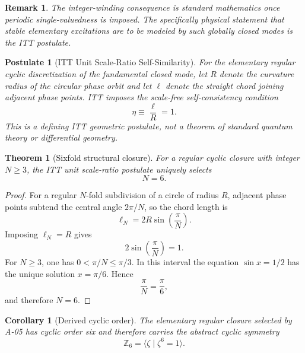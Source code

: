 \documentclass[11pt,a4paper]{article}
\newtheorem{theorem}[definition]{Theorem}
\newtheorem{corollary}[definition]{Corollary}
\newtheorem{postulate}[definition]{Postulate}
\newtheorem{remark}[definition]{Remark}
\begin{document}
\begin{remark}
The integer-winding consequence is standard mathematics once periodic single-valuedness is imposed. The specifically physical statement that stable elementary excitations are to be modeled by such globally closed modes is the ITT postulate.
\end{remark}

\begin{postulate}[ITT Unit Scale-Ratio Self-Similarity]
For the elementary regular cyclic discretization of the fundamental closed mode, let $R$ denote the curvature radius of the circular phase orbit and let $\ell$ denote the straight chord joining adjacent phase points. ITT imposes the scale-free self-consistency condition
\begin{equation}
\boxed{
\eta\equiv\frac{\ell}{R}=1.
}
\end{equation}
This is a defining ITT geometric postulate, not a theorem of standard quantum theory or differential geometry.
\end{postulate}

\begin{theorem}[Sixfold structural closure]
For a regular cyclic closure with integer $N\ge3$, the ITT unit scale-ratio postulate uniquely selects
\begin{equation}
\boxed{N=6.}
\end{equation}
\end{theorem}

\begin{proof}
For a regular $N$-fold subdivision of a circle of radius $R$, adjacent phase points subtend the central angle $2\pi/N$, so the chord length is
\begin{equation}
\ell_N
=
2R\sin\left(\frac{\pi}{N}\right).
\end{equation}
Imposing $\ell_N=R$ gives
\begin{equation}
2\sin\left(\frac{\pi}{N}\right)=1.
\end{equation}
For $N\ge3$, one has $0<\pi/N\le\pi/3$. In this interval the equation $\sin x=1/2$ has the unique solution $x=\pi/6$. Hence
\begin{equation}
\frac{\pi}{N}=\frac{\pi}{6},
\end{equation}
and therefore $N=6$.
\end{proof}

\begin{corollary}[Derived cyclic order]
The elementary regular closure selected by A-05 has cyclic order six and therefore carries the abstract cyclic symmetry
\begin{equation}
\boxed{
\mathbb Z_6=\langle\zeta\mid\zeta^6=1\rangle.
}
\end{equation}
\end{corollary}
\end{document}
